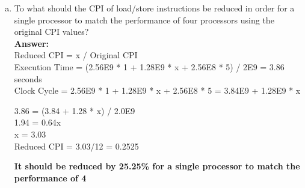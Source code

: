 \documentclass[12pt]{article}
\begin{document}
\begin{enumerate}[(a)]
    \item To what should the CPI of load/store instructions be reduced in order for a single processor to match the performance of four processors using the original CPI values?
    \\
    \textbf{Answer:}
    \\
    Reduced CPI = x / Original CPI\\
    Execution Time = (2.56E9 * 1 + 1.28E9 * x + 2.56E8 * 5) / 2E9 = 3.86 seconds\\
    Clock Cycle = 2.56E9 * 1 + 1.28E9 * x + 2.56E8 * 5 = 3.84E9 + 1.28E9 * x
    \begin{center}    
        3.86 = (3.84 + 1.28 * x) / 2.0E9\\
        1.94 = 0.64x\\
        x = 3.03\\
        Reduced CPI = 3.03/12 = 0.2525\\
    \end{center}
    \textbf{It should be reduced by 25.25\% for a single processor to match the performance of 4}
\end{enumerate}


\end{document}
